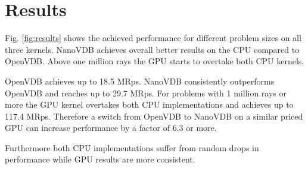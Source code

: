 \section{Results}

Fig. \ref{fig:results} shows the achieved performance for different problem sizes on all three kernels.
NanoVDB achieves overall better results on the CPU compared to OpenVDB. 
Above one million rays the GPU starts to overtake both CPU kernels.

OpenVDB achieves up to 18.5 MRps. NanoVDB consistently outperforms OpenVDB and reaches up to 29.7 MRps.
For problems with 1 million rays or more the GPU kernel overtakes both CPU implementations and achieves up to 117.4 MRps.
Therefore a switch from OpenVDB to NanoVDB on a similar priced GPU can increase performance by a factor of 6.3 or more.
 
Furthermore both CPU implementations suffer from random drops in performance while GPU results are more consistent. 


